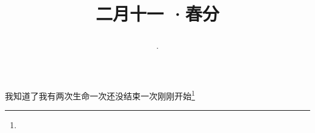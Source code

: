 \title{\date[d=20,m=3,y=2024][year:cn-y,年,month:cn,day:cn,日,·,weekday]·二月十一 ·春分}
我知道了我有两次生命一次还没结束一次刚刚开始\footnote{ }

